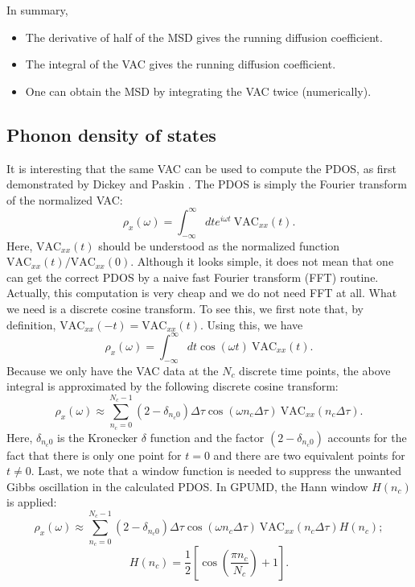 \documentclass[12pt,a4paper]{report}
\begin{document}
In summary,
\begin{itemize}
\item The derivative of half of the MSD gives the running diffusion coefficient.
\item The integral of the VAC gives the running diffusion coefficient.
\item One can obtain the MSD by integrating the VAC twice (numerically).
\end{itemize}


\subsection{Phonon density of states}


It is interesting that the same VAC can be used to compute the PDOS, as first demonstrated by Dickey and Paskin \cite{dickey1969pr}. The PDOS is simply the Fourier transform of the normalized VAC:
\begin{equation}
\rho_x(\omega) = \int_{-\infty}^{\infty} dt e^{i\omega t}~\text{VAC}_{xx}(t).
\end{equation}
Here, $\text{VAC}_{xx}(t)$ should be understood as the normalized function $\text{VAC}_{xx}(t)/\text{VAC}_{xx}(0)$. Although it looks simple, it does not mean that one can get the correct PDOS by a naive fast Fourier transform (FFT) routine. Actually, this computation is very cheap and we do not need FFT at all. What we need is a discrete cosine transform. To see this, we first note that, by definition, $\text{VAC}_{xx}(-t) = \text{VAC}_{xx}(t)$. Using this, we have
\begin{equation}
\rho_x(\omega) = \int_{-\infty}^{\infty} dt \cos (\omega t)~\text{VAC}_{xx}(t).
\end{equation}
Because we only have the VAC data at the $N_c$ discrete time points, the above integral is approximated by the following discrete cosine transform:
\begin{equation}
\rho_x(\omega) \approx \sum_{n_c=0}^{N_c-1}
(2-\delta_{n_c0}) \Delta \tau
\cos (\omega n_c \Delta \tau)~\text{VAC}_{xx}(n_c \Delta \tau).
\end{equation}
Here, $\delta_{n_c0}$ is the Kronecker $\delta$ function and the factor $(2-\delta_{n_c0})$ accounts for the fact that there is only one point for $t = 0$ and there are two equivalent points for $t \neq 0$. Last, we note that a window function is needed to suppress the unwanted Gibbs oscillation in the calculated PDOS. In GPUMD, the Hann window $H(n_c)$ is applied:
\begin{equation}
\rho_x(\omega) \approx \sum_{n_c=0}^{N_c-1}
(2-\delta_{n_c0}) \Delta \tau
\cos (\omega n_c \Delta \tau)~\text{VAC}_{xx}(n_c \Delta \tau) H(n_c);
\end{equation}
\begin{equation}
H(n_c) = \frac{1}{2}
\left[ \cos \left( \frac{\pi n_c}{N_c} \right) + 1 \right].
\end{equation}
\end{document}
